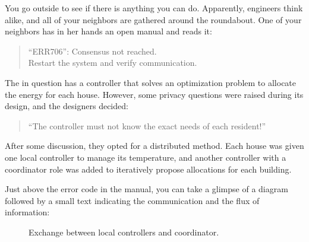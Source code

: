 \documentclass[../main.tex]{subfiles}
\begin{document}
You go outside to see if there is anything you can do.
Apparently, engineers think alike, and all of your neighbors are gathered around the roundabout.
One of your neighbors has in her hands an open manual and reads it:
\begin{quote}
  ``ERR706'': Consensus not reached.\\
  Restart the system and verify communication.
\end{quote}

The \dhn{} in question has a controller that solves an optimization problem to allocate the energy for each house.
However, some privacy questions were raised during its design, and the designers decided:
\begin{quote}
  ``The controller must not know the exact needs of each resident!''
\end{quote}

After some discussion, they opted for a distributed method.
Each house was given one local controller to manage its temperature, and another controller with a coordinator role was added to iteratively propose allocations for each building.

Just above the error code in the manual, you can take a glimpse of a diagram followed by a small text indicating the communication and the flux of information:
\begin{figure}[H]
  \centering
  \caption{Exchange between local controllers and coordinator.}\label{fig:ex_exchange_agents}
\end{figure}
\end{document}
